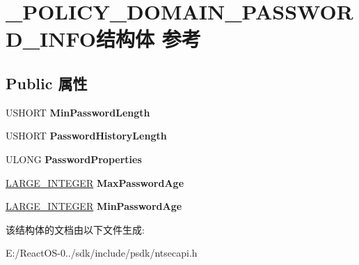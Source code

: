 \hypertarget{struct___p_o_l_i_c_y___d_o_m_a_i_n___p_a_s_s_w_o_r_d___i_n_f_o}{}\section{\+\_\+\+P\+O\+L\+I\+C\+Y\+\_\+\+D\+O\+M\+A\+I\+N\+\_\+\+P\+A\+S\+S\+W\+O\+R\+D\+\_\+\+I\+N\+F\+O结构体 参考}
\label{struct___p_o_l_i_c_y___d_o_m_a_i_n___p_a_s_s_w_o_r_d___i_n_f_o}
\subsection*{Public 属性}
\begin{DoxyCompactItemize}
\item 
\mbox{\label{struct___p_o_l_i_c_y___d_o_m_a_i_n___p_a_s_s_w_o_r_d___i_n_f_o_ad12146d2f5d0303e200bf66e9d9f4fea}} 
U\+S\+H\+O\+RT {\bfseries Min\+Password\+Length}
\item 
\mbox{\label{struct___p_o_l_i_c_y___d_o_m_a_i_n___p_a_s_s_w_o_r_d___i_n_f_o_a0b59e7c65bca02f4aa41422aabf482cb}} 
U\+S\+H\+O\+RT {\bfseries Password\+History\+Length}
\item 
\mbox{\label{struct___p_o_l_i_c_y___d_o_m_a_i_n___p_a_s_s_w_o_r_d___i_n_f_o_a0c5f29f3ace79c317379bdc3a87d0eed}} 
U\+L\+O\+NG {\bfseries Password\+Properties}
\item 
\mbox{\label{struct___p_o_l_i_c_y___d_o_m_a_i_n___p_a_s_s_w_o_r_d___i_n_f_o_a0d6dd1eecebf0e49e9b0c077b2ba10ad}} 
\hyperlink{union___l_a_r_g_e___i_n_t_e_g_e_r}{L\+A\+R\+G\+E\+\_\+\+I\+N\+T\+E\+G\+ER} {\bfseries Max\+Password\+Age}
\item 
\mbox{\label{struct___p_o_l_i_c_y___d_o_m_a_i_n___p_a_s_s_w_o_r_d___i_n_f_o_a4f7f7032ad74e85194112410941d8b8f}} 
\hyperlink{union___l_a_r_g_e___i_n_t_e_g_e_r}{L\+A\+R\+G\+E\+\_\+\+I\+N\+T\+E\+G\+ER} {\bfseries Min\+Password\+Age}
\end{DoxyCompactItemize}


该结构体的文档由以下文件生成\+:\begin{DoxyCompactItemize}
\item 
E\+:/\+React\+O\+S-\/0../sdk/include/psdk/ntsecapi.\+h\end{DoxyCompactItemize}
